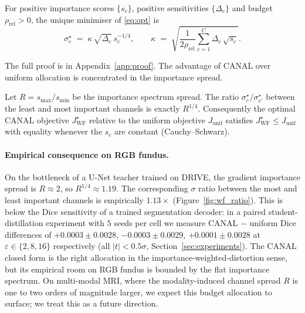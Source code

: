 \begin{theorem}
\label{thm:wf}
For positive importance scores $\{s_c\}$, positive sensitivities
$\{\Delta_c\}$ and budget $\rho_{\mathrm{rel}}>0$, the unique
minimiser of \eqref{eq:opt} is
\begin{equation}
\sigma^{\star}_c \;=\; \kappa \,\sqrt{\Delta_c}\, s_c^{-1/4},
\qquad
\kappa \;=\; \sqrt{\frac{1}{2\rho_{\mathrm{rel}}}
                          \sum_{c=1}^{C}\Delta_c\,\sqrt{s_c}}.
\label{eq:wf}
\end{equation}
\end{theorem}

The full proof is in Appendix~\ref{app:proof}. The advantage of CANAL
over uniform allocation is concentrated in the importance spread.

\begin{corollary}
\label{cor:r14}
Let $R = s_{\max}/s_{\min}$ be the importance spectrum spread. The
ratio $\sigma_c^{\star}/\sigma_{c'}^{\star}$ between the least and most
important channels is exactly $R^{1/4}$. Consequently the optimal
CANAL objective $J_{\mathrm{WF}}^{\star}$ relative to the uniform
objective $J_{\mathrm{unif}}$ satisfies $J_{\mathrm{WF}}^{\star} \le
J_{\mathrm{unif}}$ with equality whenever the $s_c$ are constant
(Cauchy--Schwarz).
\end{corollary}

\paragraph{Empirical consequence on RGB fundus.}
On the bottleneck of a U-Net teacher trained on DRIVE, the gradient
importance spread is $R \!\approx\! 2$, so $R^{1/4} \!\approx\! 1.19$.
The corresponding $\sigma$ ratio between the most and least important
channels is empirically $1.13\times$ (Figure~\ref{fig:wf_ratio}). This
is below the Dice sensitivity of a trained segmentation decoder: in a
paired student-distillation experiment with $5$ seeds per cell we
measure CANAL $-$ uniform Dice differences of $+0.0003 \pm 0.0028$,
$-0.0003 \pm 0.0029$, $+0.0001 \pm 0.0028$ at $\varepsilon\!\in\!\{2,
8, 16\}$ respectively (all $|t| < 0.5\sigma$,
Section~\ref{sec:experiments}). The CANAL closed form is the right
allocation in the importance-weighted-distortion sense, but its
empirical room on RGB fundus is bounded by the flat importance
spectrum. On multi-modal MRI, where the modality-induced channel
spread $R$ is one to two orders of magnitude larger, we expect this
budget allocation to surface; we treat this as a future direction.


